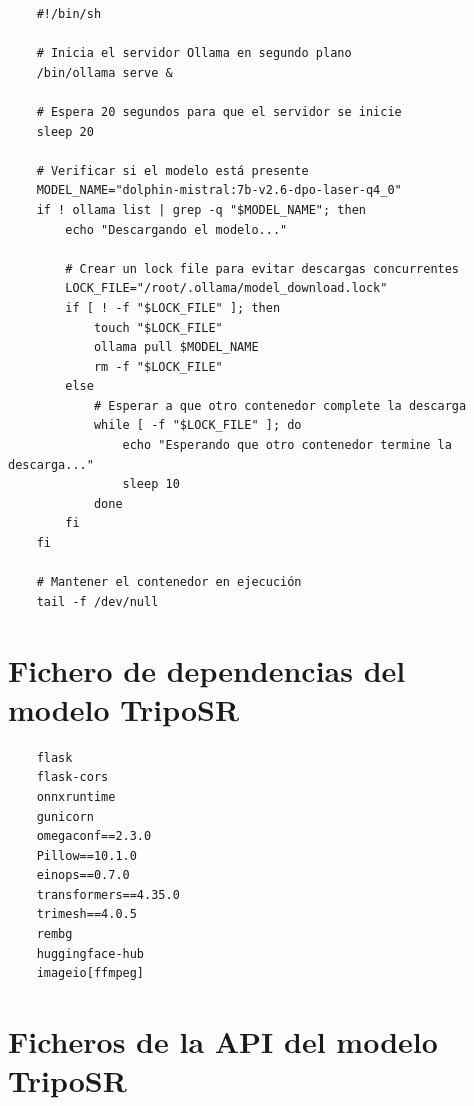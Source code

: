 \captionsetup{type=listing}
\label{lst:scriptOllama}
\begin{verbatim}
    #!/bin/sh
    
    # Inicia el servidor Ollama en segundo plano
    /bin/ollama serve &
    
    # Espera 20 segundos para que el servidor se inicie
    sleep 20
    
    # Verificar si el modelo está presente
    MODEL_NAME="dolphin-mistral:7b-v2.6-dpo-laser-q4_0"
    if ! ollama list | grep -q "$MODEL_NAME"; then
        echo "Descargando el modelo..."
        
        # Crear un lock file para evitar descargas concurrentes
        LOCK_FILE="/root/.ollama/model_download.lock"
        if [ ! -f "$LOCK_FILE" ]; then
            touch "$LOCK_FILE"
            ollama pull $MODEL_NAME
            rm -f "$LOCK_FILE"
        else
            # Esperar a que otro contenedor complete la descarga
            while [ -f "$LOCK_FILE" ]; do
                echo "Esperando que otro contenedor termine la descarga..."
                sleep 10
            done
        fi
    fi
    
    # Mantener el contenedor en ejecución
    tail -f /dev/null
\end{verbatim}



\section{Fichero de dependencias del modelo TripoSR}
\label{sec:puntoA3}
\captionsetup{type=listing}
\label{lst:dependencias3D}
\begin{verbatim}
    flask
    flask-cors
    onnxruntime
    gunicorn
    omegaconf==2.3.0
    Pillow==10.1.0
    einops==0.7.0
    transformers==4.35.0
    trimesh==4.0.5
    rembg
    huggingface-hub
    imageio[ffmpeg]
\end{verbatim}



\section{Ficheros de la API del modelo TripoSR}
\label{sec:puntoA4}
 
